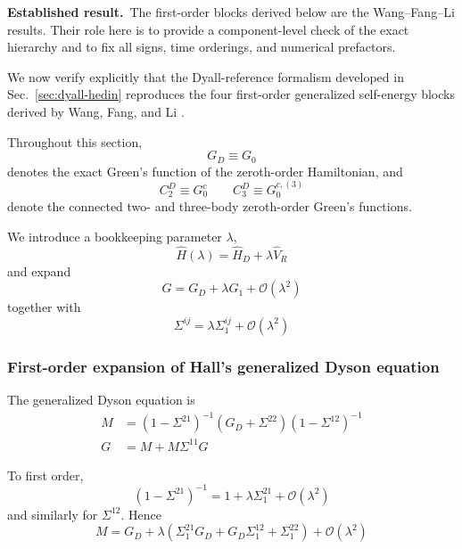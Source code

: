 \documentclass[aip,jcp,reprint,noshowkeys,superscriptaddress]{revtex4-1}
\newcommand{\Established}{\textbf{Established result.}\ }
\begin{document}
\Established The first-order blocks derived below are the
Wang--Fang--Li results.  Their role here is to provide a component-level check
of the exact hierarchy and to fix all signs, time orderings, and numerical
prefactors.


We now verify explicitly that the Dyall-reference formalism developed
in Sec.~\ref{sec:dyall-hedin} reproduces the four first-order
generalized self-energy blocks derived by Wang, Fang, and Li
\cite{WangFangLi2026}.

Throughout this section,
\begin{equation}
  G_D \equiv G_0
\end{equation}
denotes the exact Green's function of the zeroth-order Hamiltonian,
and
\begin{equation}
  C_2^D \equiv G_0^c
  \qquad
  C_3^D \equiv G_0^{c,(3)}
\end{equation}
denote the connected two- and three-body zeroth-order Green's
functions.

We introduce a bookkeeping parameter $\lambda$,
\begin{equation}
  \hat H(\lambda)
  =
  \hat H_D
  +
  \lambda \hat V_R
\end{equation}
and expand
\begin{equation}
  G
  =
  G_D
  +
  \lambda G_1
  +
  \mathcal O(\lambda^2)
\end{equation}
together with
\begin{equation}
  \Sigma^{ij}
  =
  \lambda\Sigma_1^{ij}
  +
  \mathcal O(\lambda^2)
\end{equation}


\subsubsection{First-order expansion of Hall's generalized Dyson equation}

The generalized Dyson equation is
\begin{align}
  M
  &=
  (1-\Sigma^{21})^{-1}
  (G_D+\Sigma^{22})
  (1-\Sigma^{12})^{-1}
  \\
  G
  &=
  M
  +
  M\Sigma^{11}G
\end{align}

To first order,
\begin{equation}
  (1-\Sigma^{21})^{-1}
  =
  1+\lambda\Sigma_1^{21}
  +
  \mathcal O(\lambda^2)
\end{equation}
and similarly for $\Sigma^{12}$.  Hence
\begin{equation}
  M
  =
  G_D
  +
  \lambda
  \left(
    \Sigma_1^{21}G_D
    +
    G_D\Sigma_1^{12}
    +
    \Sigma_1^{22}
  \right)
  +
  \mathcal O(\lambda^2)
\end{equation}
\end{document}
